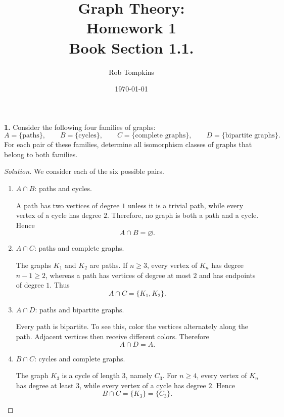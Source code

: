 \documentclass[12pt]{amsart}
\title{Graph Theory:\\Homework 1\\ Book Section 1.1.}
\author{Rob Tompkins}
\date{\today}
\theoremstyle{conjecture}
\theoremstyle{definition}
\theoremstyle{question}
\theoremstyle{theorem}
\newenvironment{solution}
{\begin{proof}[Solution]}
{\end{proof}}
\begin{document}
    \maketitle

    \textbf{1.} Consider the following four families of graphs:
    \[
        A=\{\text{paths}\}, \qquad
        B=\{\text{cycles}\}, \qquad
        C=\{\text{complete graphs}\}, \qquad
        D=\{\text{bipartite graphs}\}.
    \]
    For each pair of these families, determine all isomorphism classes of
    graphs that belong to both families.

    \begin{solution}
        We consider each of the six possible pairs.

        \begin{enumerate}[label=(\alph*)]
            \item $A\cap B$: paths and cycles.

            A path has two vertices of degree $1$ unless it is a trivial
            path, while every vertex of a cycle has degree $2$. Therefore,
            no graph is both a path and a cycle. Hence
            \[
                A\cap B=\varnothing.
            \]

            \item $A\cap C$: paths and complete graphs.

            The graphs $K_1$ and $K_2$ are paths. If $n\geq 3$, every
            vertex of $K_n$ has degree $n-1\geq 2$, whereas a path has
            vertices of degree at most $2$ and has endpoints of degree $1$.
            Thus
            \[
                A\cap C=\{K_1,K_2\}.
            \]

            \item $A\cap D$: paths and bipartite graphs.

            Every path is bipartite. To see this, color the vertices
            alternately along the path. Adjacent vertices then receive
            different colors. Therefore
            \[
                A\cap D=A.
            \]

            \item $B\cap C$: cycles and complete graphs.

            The graph $K_3$ is a cycle of length $3$, namely $C_3$.
            For $n\geq 4$, every vertex of $K_n$ has degree at least $3$,
            while every vertex of a cycle has degree $2$. Hence
            \[
                B\cap C=\{K_3\}=\{C_3\}.
            \]


\end{enumerate}
\end{solution}
\end{document}
